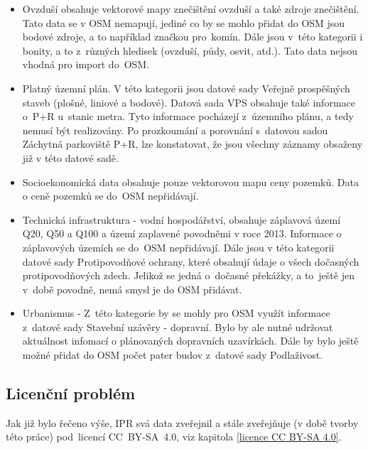 \begin{itemize}
    \item   Ovzduší obsahuje vektorové mapy znečištění ovzduší a také
            zdroje znečištění. Tato data se v OSM nemapují, jediné co
            by se mohlo přidat do OSM jsou bodové zdroje, a to
            například značkou pro~komín. Dále jsou v~této kategorii i
            bonity, a to z~různých hledisek (ovzduší, půdy,
            osvit, atd.). Tato data nejsou vhodná pro import do~OSM.

    \item   Platný územní plán. V této kategorii jsou datové sady
            Veřejně prospěšných staveb (plošné, liniové a bodové).
            Datová sada VPS obsahuje také informace o~P+R u~stanic
            metra. Tyto informace pocházejí z~územního plánu, a tedy nemusí být
            realizovány. Po prozkoumání a porovnání s~datovou sadou
            Záchytná parkoviště P+R, lze konstatovat, že jsou všechny záznamy obsaženy již v této datové sadě.

    \item   Socioekonomická data obsahuje pouze vektorovou mapu ceny
            pozemků. Data o ceně pozemků se do~OSM nepřidávají. 

    \item   Technická infrastruktura - vodní hospodářství, obsahuje
            záplavová území Q20, Q50 a Q100 a území zaplavené
            povodněmi v roce 2013. Informace o záplavových územích se do~OSM
            nepřidávají. Dále jsou v této kategorii datové sady
            Protipovodňové ochrany, které obsahují údaje o všech dočasných
            protipovodňových zdech. Jelikož se jedná o~dočasné překážky, a to~ještě jen v~době povodně, nemá smysl je do OSM přidávat.

    \item   Urbanismus - Z~této kategorie by se mohly pro OSM využít
            informace z~datové sady
            Stavební uzávěry - dopravní. Bylo by ale nutné udržovat
            aktuálnost infomací o plánovaných dopravních uzavírkách.
            Dále by bylo ještě možné přidat do OSM počet pater budov
            z~datové sady Podlaživost.
\end{itemize}


\subsection{Licenční problém}
\label{Licenční problém}
Jak již bylo řečeno výše, IPR svá data zveřejnil a stále zveřejňuje
(v době tvorby této práce) pod~licencí CC~BY-SA~4.0, viz kapitola \ref{licence CC BY-SA 4.0}.

